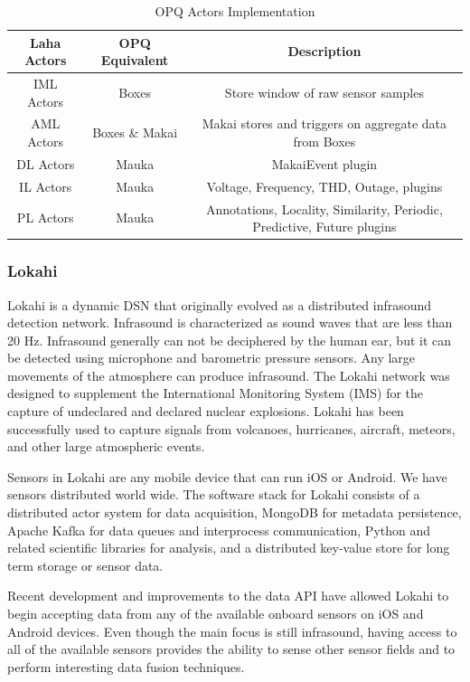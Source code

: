 \begin{table}
	\caption{OPQ  Actors Implementation}
	\begin{tabular}{|c|c|c|}
		\hline 
		Laha Actors & OPQ Equivalent & Description \\ 
		\hline
		IML Actors & Boxes & Store window of raw sensor samples \\
		\hline
		AML Actors & Boxes \& Makai & Makai stores and triggers on aggregate data from Boxes \\
		\hline
		DL Actors & Mauka & MakaiEvent plugin \\
		\hline
		IL Actors & Mauka & Voltage, Frequency, THD, Outage, plugins \\
		\hline
		PL Actors & Mauka & Annotations, Locality, Similarity,  Periodic, Predictive,  Future plugins\\
		\hline
	\end{tabular}
	\label{opq-actors}
\end{table}  

\subsubsection{Lokahi}
Lokahi is a dynamic DSN that originally evolved as a distributed infrasound detection network. Infrasound is characterized as sound waves that are less than 20 Hz. Infrasound generally can not be deciphered by the human ear, but it can be detected using microphone and barometric pressure sensors. Any large movements of the atmosphere can produce infrasound. The Lokahi network was designed to supplement the International Monitoring System (IMS) for the capture  of undeclared and declared nuclear explosions. Lokahi has been successfully used to capture signals from volcanoes, hurricanes, aircraft, meteors, and other large atmospheric events. 

Sensors in Lokahi are any mobile device that can run iOS or Android. We have sensors distributed world wide. The software stack for Lokahi consists of a distributed actor system for data acquisition, MongoDB for metadata persistence, Apache Kafka for data queues and interprocess communication, Python and related scientific libraries for analysis, and a distributed key-value store for long term storage or sensor data.

Recent development and improvements to the data API have allowed Lokahi to begin accepting data from any of the available onboard sensors on iOS and Android devices. Even though the main focus is still infrasound, having access to all of the available sensors provides the ability to sense other sensor fields and to perform interesting data fusion techniques. 

